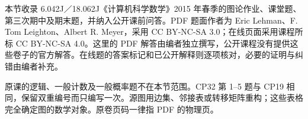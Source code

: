 \label{sec:6042-assessments}
本节收录 6.042J／18.062J《计算机科学数学》2015 年春季的图论作业、课堂题、第三次期中及期末题，并纳入公开课前问答。PDF 题面作者为 Eric Lehman、F. Tom Leighton、Albert R. Meyer，采用 CC BY-NC-SA 3.0；在线页面采用课程所标 CC BY-NC-SA 4.0。这里的 PDF 解答由编者独立撰写，公开课程没有提供这些卷子的官方解答。在线题的答案标记和已公开解释则逐项核对，必要的证明与纠错由编者补充。

原课的逻辑、一般计数及一般概率题不在本节范围。CP32 第 1--5 题与 CP19 相同，保留双重编号而只编写一次。源图用边集、邻接表或转移矩阵重构；这些表格完全确定图的数学对象。原卷页码一律指 PDF 的物理页。








